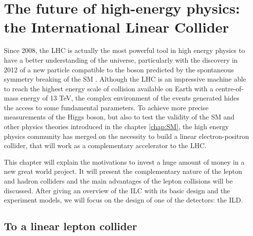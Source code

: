 \chapter[The ILC]{The future of high-energy physics: the International Linear Collider}
\label{chap:ILC}



  Since 2008, the \gls{LHC} is actually the most powerful tool in high energy physics to have a better understanding of the universe, particularly with the discovery in 2012 of a new particle compatible to the boson predicted by the spontaneous symmetry breaking of the SM \cite{Aad2012, Chatrchyan2012}.
  Although the \gls{LHC} is an impressive machine able to reach the highest energy scale of collision available on Earth with a centre-of-mass energy of 13 TeV, the complex environment of the events generated hides the access to some fundamental parameters. 
  To achieve more precise measurements of the Higgs boson, but also to test the validity of the SM and other physics theories introduced in the chapter \ref{chap:SM}, the high energy physics community has merged on the necessity to build a linear electron-positron collider, that will work as a complementary accelerator to the \gls{LHC}.
  
  This chapter will explain the motivations to invest a huge amount of money in a new great world project. 
  It will present the complementary nature of the lepton and hadron colliders and the main advantages of the lepton collisions will be discussed.
  After giving an overview of the ILC with its basic design and the experiment models, we will focus on the design of one of the detectors: the \gls{ILD}.

 \minitoc
  
  \section{To a linear lepton collider}
 

